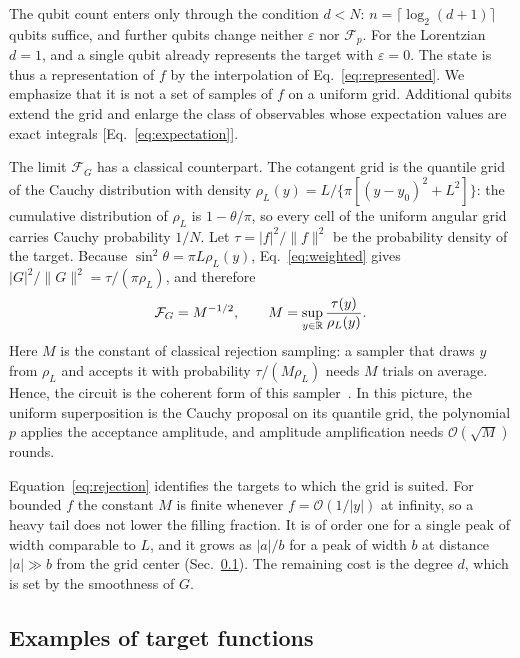 The qubit count enters only through the condition $d<N$:
$n=\lceil\log_2(d+1)\rceil$ qubits suffice, and further qubits
change neither $\varepsilon$ nor $\mathcal{F}_p$.  For the
Lorentzian $d=1$, and a single qubit already represents the target
with $\varepsilon=0$.  The state is thus a representation of $f$ by
the interpolation of Eq.~\eqref{eq:represented}.  We emphasize
that it is not a set of samples of $f$ on a uniform grid.  Additional
qubits extend the grid and enlarge the
class of observables whose expectation values are exact integrals
[Eq.~\eqref{eq:expectation}].

The limit $\mathcal{F}_G$ has a classical counterpart.  The
cotangent grid is the quantile grid of the Cauchy distribution with
density $\rho_L(y)=L/\{\pi[(y-y_0)^2+L^2]\}$: the cumulative
distribution of $\rho_L$ is $1-\theta/\pi$, so every cell of the
uniform angular grid carries Cauchy probability $1/N$.  Let
$\tau=|f|^2/\|f\|^2$ be the probability density of the target.
Because $\sin^2\theta=\pi L\rho_L(y)$, Eq.~\eqref{eq:weighted}
gives $|G|^2/\|G\|^2=\tau/(\pi\rho_L)$, and therefore
\begin{equation}
	\mathcal{F}_G=M^{-1/2},\qquad
	M=\sup_{y\in\mathbb{R}}\frac{\tau(y)}{\rho_L(y)}.
	\label{eq:rejection}
\end{equation}
Here $M$ is the constant of classical rejection sampling: a sampler
that draws $y$ from $\rho_L$ and accepts it with probability
$\tau/(M\rho_L)$ needs $M$ trials on average.  Hence, the circuit is the coherent
form of this
sampler~\cite{OzolsRoettelerRoland2013,LemieuxEtAl2024}.  In this
picture, the uniform superposition is the Cauchy proposal on its quantile grid, the polynomial $p$ applies the
acceptance amplitude, and amplitude amplification needs
$\mathcal{O}(\sqrt{M})$ rounds.

Equation~\eqref{eq:rejection} identifies the targets to which the
grid is suited.  For bounded $f$ the constant
$M$ is finite whenever $f=\mathcal{O}(1/|y|)$ at infinity, so a
heavy tail does not lower the filling fraction.  It is of order one
for a single peak of width comparable to $L$, and it grows as
$|a|/b$ for a peak of width $b$ at distance $|a|\gg b$ from the grid
center (Sec.~\ref{subsec:examples}).  The remaining cost is the
degree $d$, which is set by the smoothness of $G$.

\subsection{Examples of target functions}
\label{subsec:examples}

